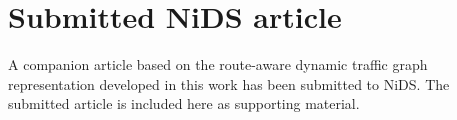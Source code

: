 \chapter{Submitted NiDS article}
\label{ap:nids-paper}

A companion article based on the route-aware dynamic traffic graph representation developed in this work has been submitted to NiDS. The submitted article is included here as supporting material.

